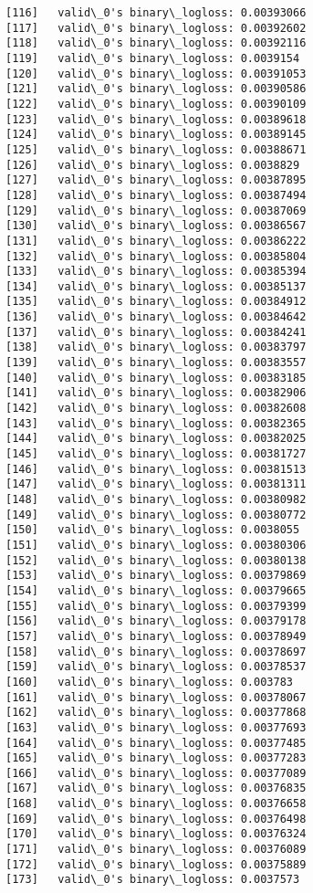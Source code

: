 \documentclass[11pt]{article}
\begin{document}
\begin{Verbatim}[commandchars=\\\{\}]
[116]	valid\_0's binary\_logloss: 0.00393066
[117]	valid\_0's binary\_logloss: 0.00392602
[118]	valid\_0's binary\_logloss: 0.00392116
[119]	valid\_0's binary\_logloss: 0.0039154
[120]	valid\_0's binary\_logloss: 0.00391053
[121]	valid\_0's binary\_logloss: 0.00390586
[122]	valid\_0's binary\_logloss: 0.00390109
[123]	valid\_0's binary\_logloss: 0.00389618
[124]	valid\_0's binary\_logloss: 0.00389145
[125]	valid\_0's binary\_logloss: 0.00388671
[126]	valid\_0's binary\_logloss: 0.0038829
[127]	valid\_0's binary\_logloss: 0.00387895
[128]	valid\_0's binary\_logloss: 0.00387494
[129]	valid\_0's binary\_logloss: 0.00387069
[130]	valid\_0's binary\_logloss: 0.00386567
[131]	valid\_0's binary\_logloss: 0.00386222
[132]	valid\_0's binary\_logloss: 0.00385804
[133]	valid\_0's binary\_logloss: 0.00385394
[134]	valid\_0's binary\_logloss: 0.00385137
[135]	valid\_0's binary\_logloss: 0.00384912
[136]	valid\_0's binary\_logloss: 0.00384642
[137]	valid\_0's binary\_logloss: 0.00384241
[138]	valid\_0's binary\_logloss: 0.00383797
[139]	valid\_0's binary\_logloss: 0.00383557
[140]	valid\_0's binary\_logloss: 0.00383185
[141]	valid\_0's binary\_logloss: 0.00382906
[142]	valid\_0's binary\_logloss: 0.00382608
[143]	valid\_0's binary\_logloss: 0.00382365
[144]	valid\_0's binary\_logloss: 0.00382025
[145]	valid\_0's binary\_logloss: 0.00381727
[146]	valid\_0's binary\_logloss: 0.00381513
[147]	valid\_0's binary\_logloss: 0.00381311
[148]	valid\_0's binary\_logloss: 0.00380982
[149]	valid\_0's binary\_logloss: 0.00380772
[150]	valid\_0's binary\_logloss: 0.0038055
[151]	valid\_0's binary\_logloss: 0.00380306
[152]	valid\_0's binary\_logloss: 0.00380138
[153]	valid\_0's binary\_logloss: 0.00379869
[154]	valid\_0's binary\_logloss: 0.00379665
[155]	valid\_0's binary\_logloss: 0.00379399
[156]	valid\_0's binary\_logloss: 0.00379178
[157]	valid\_0's binary\_logloss: 0.00378949
[158]	valid\_0's binary\_logloss: 0.00378697
[159]	valid\_0's binary\_logloss: 0.00378537
[160]	valid\_0's binary\_logloss: 0.003783
[161]	valid\_0's binary\_logloss: 0.00378067
[162]	valid\_0's binary\_logloss: 0.00377868
[163]	valid\_0's binary\_logloss: 0.00377693
[164]	valid\_0's binary\_logloss: 0.00377485
[165]	valid\_0's binary\_logloss: 0.00377283
[166]	valid\_0's binary\_logloss: 0.00377089
[167]	valid\_0's binary\_logloss: 0.00376835
[168]	valid\_0's binary\_logloss: 0.00376658
[169]	valid\_0's binary\_logloss: 0.00376498
[170]	valid\_0's binary\_logloss: 0.00376324
[171]	valid\_0's binary\_logloss: 0.00376089
[172]	valid\_0's binary\_logloss: 0.00375889
[173]	valid\_0's binary\_logloss: 0.0037573

\end{Verbatim}
\end{document}

